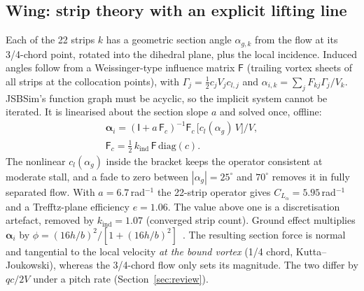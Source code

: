 \documentclass[10pt,a4paper,twocolumn]{article}
\begin{document}
\subsection{Wing: strip theory with an explicit lifting line}
Each of the 22 strips $k$ has a geometric section angle $\alpha_{g,k}$ from the flow at its 3/4-chord point, rotated into the
dihedral plane, plus the local incidence. Induced angles follow from a Weissinger-type influence matrix $\mathsf F$ (trailing
vortex sheets of all strips at the collocation points), with $\Gamma_j=\tfrac12 c_j V_j c_{l,j}$ and
$\alpha_{i,k}=\sum_j F_{kj}\Gamma_j/V_k$. JSBSim's function graph must be acyclic, so the implicit system cannot be iterated.
It is linearised about the section slope $a$ and solved once, offline:
\begin{equation}
\begin{gathered}
\boldsymbol\alpha_i = (\mathsf I + a\,\mathsf F_c)^{-1}\mathsf F_c\,\bigl[c_l(\alpha_g)\,V\bigr]\big/V,\\
\mathsf F_c = \tfrac12\,k_\text{ind}\,\mathsf F\,\mathrm{diag}(c).
\end{gathered}
\label{eq:ll}
\end{equation}
The nonlinear $c_l(\alpha_g)$ inside the bracket keeps the operator consistent at moderate stall, and a fade to zero between
$|\alpha_g|=25^\circ$ and $70^\circ$ removes it in fully separated flow. With $a=6.7$\,rad$^{-1}$ the 22-strip operator gives
$C_{L_\alpha}=5.95$\,rad$^{-1}$ and a Trefftz-plane efficiency $e=1.06$. The value above one is a discretisation artefact,
removed by $k_\text{ind}=1.07$ (converged strip count). Ground effect multiplies $\boldsymbol\alpha_i$ by
$\phi=(16h/b)^2/[1+(16h/b)^2]$~\cite{mccormick}.
The resulting section force is normal and tangential to the local velocity \emph{at the bound vortex} (1/4 chord, Kutta--Joukowski),
whereas the 3/4-chord flow only sets its magnitude. The two differ by $qc/2V$ under a pitch rate (Section~\ref{sec:review}).
\end{document}

